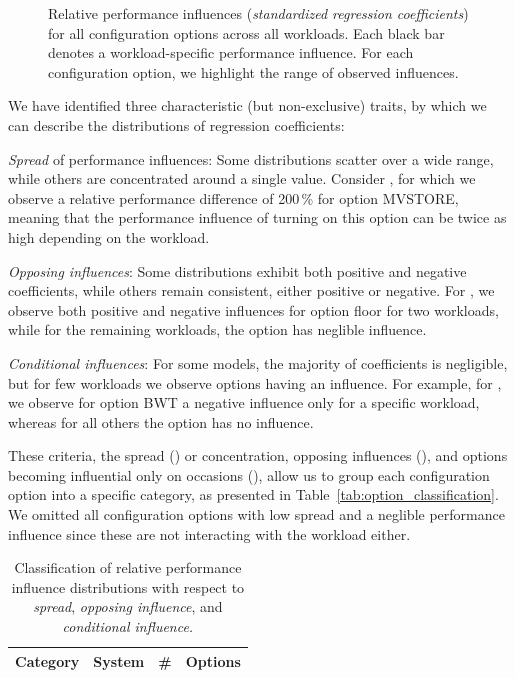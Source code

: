 {\begin{figure}
	\caption{Relative performance influences (\textit{standardized regression coefficients}) for all configuration options across all workloads. Each black bar denotes a workload-specific performance influence. For each configuration option, we highlight the range of observed influences. }
	\label{fig:results_influence}
\end{figure}
{\color{orange!0!black}
We have identified three characteristic (but non-exclusive) traits, by which we can describe the distributions of regression coefficients: 
\begin{compactitem}	
\item[\circled{1}] \emph{Spread} of performance influences: Some distributions scatter over a wide range, while others are concentrated around a single value. Consider \htwo, for which we observe a relative performance difference of 200\,\% for option \textsf{MVSTORE}, meaning that the performance influence of turning on this option can be twice as high depending on the workload. 

\item[\circled{2}] \emph{Opposing influences}: Some distributions exhibit both positive and negative coefficients, while others remain consistent, either positive or negative. For \dconvert, we observe both positive and negative influences for option \textsf{floor} for two workloads, while for the remaining workloads, the option has neglible influence.

\item[\circled{3}] \emph{Conditional influences}: For some models, the majority of coefficients is negligible, but for few workloads we observe options having an influence. For example, for \kanzi, we observe for option \textsf{BWT} a negative influence only for a specific workload, whereas for all others the option has no influence.
\end{compactitem}
	
These criteria, the spread () or concentration, opposing influences (), and options becoming influential only on occasions (), allow us to group each configuration option into a specific category, as presented in Table~\ref{tab:option_classification}. We omitted all configuration options with low spread and a neglible performance influence since these are not interacting with the workload either. 
}
\begin{table}[ht!]
	\centering
	\footnotesize
	\caption{Classification of relative performance influence distributions with respect to \textit{spread}, \textit{opposing influence}, and \textit{conditional influence.}}
	\begin{tabular}{p{1.2cm}p{0.7cm}rp{4.9cm}} %
		\toprule
		\textbf{Category} & \textbf{System} & \textbf{\#} & \textbf{Options} \\
		\midrule
		

\end{tabular}
\end{table}}

